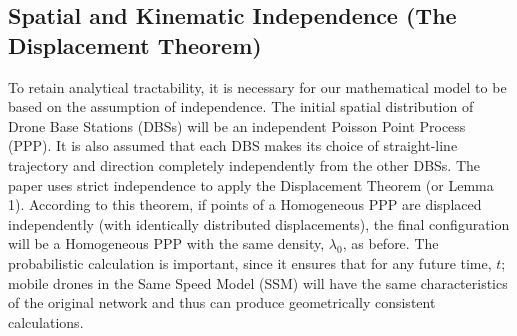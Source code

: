 \documentclass[12pt,a4paper]{article}
\begin{document}
   \subsection*{Spatial and Kinematic Independence (The Displacement Theorem)} %
To retain analytical tractability, it is necessary for our mathematical model to be based on the assumption of independence.    %
The initial spatial distribution of Drone Base Stations (DBSs) will be an independent Poisson Point Process (PPP).    %
It is also assumed that each DBS makes its choice of straight-line trajectory and direction completely independently from the other DBSs.    %
The paper uses strict independence to apply the Displacement Theorem (or Lemma 1).    %
According to this theorem, if points of a Homogeneous PPP are displaced independently (with identically distributed displacements), the final configuration will be a Homogeneous PPP with the same density, $\lambda_0$, as before.    %
The probabilistic calculation is important, since it ensures that for any future time, $t$; mobile drones in the Same Speed Model (SSM) will have the same characteristics of the original network and thus can produce geometrically consistent calculations.    %
\end{document}
